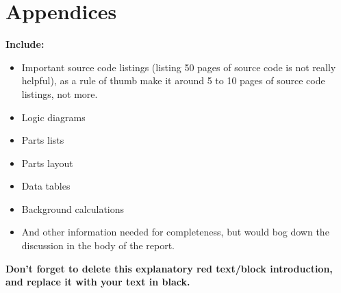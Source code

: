 \chapter{Appendices} %

\begin{tcolorbox}[      %
    boxrule=0pt,        %
    colback=white,      %
    coltext=red         %
]                       %
    \textbf{Include:}
    \begin{itemize}
        \item Important source code listings (listing 50 pages of source code is not really helpful), as a rule of thumb make it around 5 to 10 pages of source code listings, not more.
        \item Logic diagrams
        \item Parts lists
        \item Parts layout
        \item Data tables
        \item Background calculations
        \item And other information needed for completeness, but would bog down the discussion in the body of the report.
    \end{itemize}
    
    \vspace{15pt}       %
    \begin{center}      %
    \textbf{Don't forget to delete this explanatory red text/block introduction, and replace it with your text in black.}
    \end{center}        %
\end{tcolorbox}         %